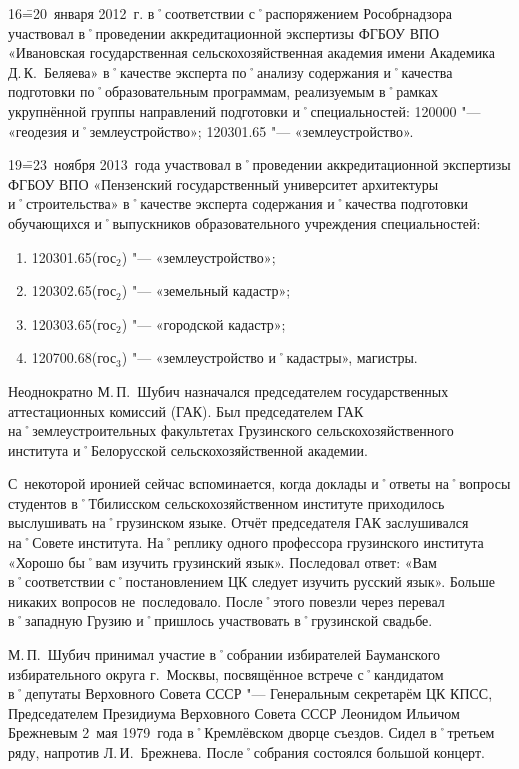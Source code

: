 16\==20~января 2012~г. в˚соответствии с˚распоряжением Рособрнадзора участвовал в˚проведении аккредитационной экспертизы ФГБОУ ВПО «Ивановская государственная сельскохозяйственная академия имени Академика Д.\,К.~Беляева» в˚качестве эксперта по˚анализу содержания и˚качества подготовки по˚образовательным программам, реализуемым в˚рамках укрупнённой группы направлений подготовки и˚специальностей: 120000 "--- «геодезия и˚землеустройство»; 120301.65 "--- «землеустройство».

19\==23~ноября 2013~года участвовал в˚проведении аккредитационной экспертизы ФГБОУ ВПО «Пензенский государственный университет архитектуры и˚строительства» в˚качестве эксперта содержания и˚качества подготовки обучающихся и˚выпускников образовательного учреждения специальностей:

\begin{enumerate}
	\item 120301.65(гос$_2$) "--- «землеустройство»; 
	\item 120302.65(гос$_2$) "--- «земельный кадастр»; 
	\item 120303.65(гос$_2$) "--- «городской кадастр»; 
 	\item 120700.68(гос$_3$) "--- «землеустройство и˚кадастры», магистры.
\end{enumerate}

Неоднократно М.\,П.~Шубич назначался председателем государственных аттестационных комиссий (ГАК). Был председателем ГАК на˚землеустроительных факультетах Грузинского сельскохозяйственного института и˚Белорусской сельскохозяйственной академии. 

С~некоторой иронией сейчас вспоминается, когда доклады и˚ответы на˚вопросы студентов в˚Тбилисском сельскохозяйственном институте приходилось выслушивать на˚грузинском языке. Отчёт председателя ГАК заслушивался на˚Совете института. На˚реплику одного профессора грузинского института «Хорошо бы˚вам изучить грузинский язык». Последовал ответ: «Вам в˚соответствии с˚постановлением ЦК следует изучить русский язык». Больше никаких вопросов не~последовало. После˚этого повезли через перевал в˚западную Грузию и˚пришлось участвовать в˚грузинской свадьбе.

М.\,П.~Шубич принимал участие в˚собрании избирателей Бауманского избирательного округа г.~Москвы, посвящённое встрече с˚кандидатом в˚депутаты Верховного Совета СССР "--- Генеральным секретарём ЦК КПСС, Председателем Президиума Верховного Совета СССР Леонидом Ильичом Брежневым 2~мая 1979~года в˚Кремлёвском дворце съездов. Сидел в˚третьем ряду, напротив Л.\,И.~Брежнева. После˚собрания состоялся большой концерт. 

